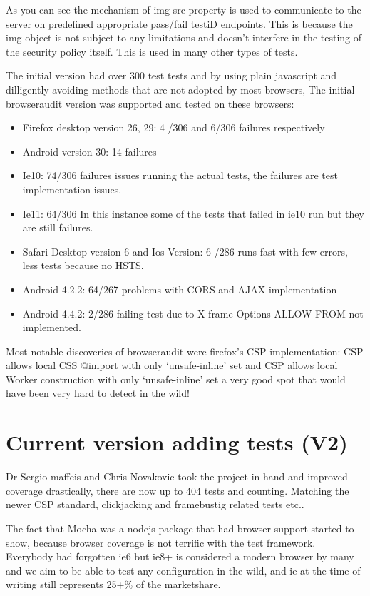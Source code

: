 As you can see the mechanism of img src property is used to communicate to the server on predefined appropriate pass/fail testiD endpoints. This is because 
the img object is not subject to any limitations and doesn't interfere in the testing of the security policy itself. This is used in many other types of tests.

The initial version had over 300 test tests and by using plain javascript and dilligently avoiding methods that are not adopted by most browsers,
The initial browseraudit version was supported and tested on these browsers:

\begin{itemize}
 \item Firefox desktop version 26, 29:  4 /306 and 6/306 failures respectively
 \item Android version 30: 14 failures
 \item Ie10: 74/306 failures issues running the actual tests, the failures are test implementation issues.
 \item Ie11: 64/306 In this instance some of the tests that failed in ie10 run but they are still failures.
 \item Safari Desktop version 6 and Ios Version: 6 /286 runs fast with few errors, less tests because no HSTS.
 \item Android 4.2.2: 64/267 problems with CORS and AJAX implementation
 \item Android 4.4.2: 2/286 failing test due to X-frame-Options ALLOW FROM not implemented.
\end{itemize}

Most notable discoveries of browseraudit were firefox's CSP implementation: CSP allows local CSS @import with only `unsafe-inline' set and 
CSP allows local Worker construction with only `unsafe-inline' set a very good spot that would have been very hard to detect in the wild!

\section{Current version adding tests (V2)}

Dr Sergio maffeis and Chris Novakovic took the project in hand and improved coverage drastically, there are now up to 404 tests and counting.
Matching the newer CSP standard, clickjacking and framebustig related tests etc..

The fact that Mocha was a nodejs package that had browser support started to show, because browser coverage is not terrific with the test framework.
Everybody had forgotten ie6 but ie8+ is considered a modern browser by many and we aim to be able to test any configuration in the wild, and ie at the time
of writing still represents 25+\% of the marketshare.\

